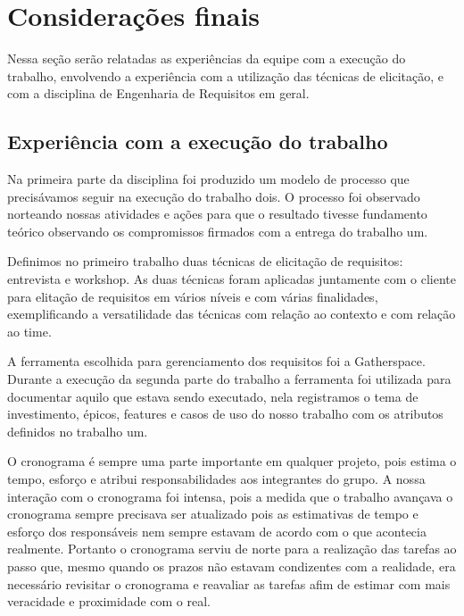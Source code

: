 \chapter[Considerações finais]{Considerações finais}
    
  Nessa seção serão relatadas as experiências da equipe com a execução do trabalho, envolvendo a experiência com 
  a utilização das técnicas de elicitação, e com a disciplina de Engenharia de Requisitos em geral.
  
  \section{Experiência com a execução do trabalho}
  
    Na primeira parte da disciplina foi produzido um modelo de processo que precisávamos seguir na execução do trabalho dois. 
  O processo foi observado norteando nossas atividades e ações para que o resultado tivesse fundamento teórico observando 
  os compromissos firmados com a entrega do trabalho um.
    
    Definimos no primeiro trabalho duas técnicas de elicitação de requisitos: entrevista e workshop. 
  As duas técnicas foram aplicadas juntamente com o cliente para elitação de requisitos em vários 
  níveis e com várias finalidades, exemplificando a versatilidade das técnicas com relação ao contexto e com relação ao time.
    
    A ferramenta escolhida para gerenciamento dos requisitos foi a Gatherspace. Durante a execução da segunda 
  parte do trabalho a ferramenta foi utilizada para documentar aquilo que estava sendo executado, nela registramos 
  o tema de investimento, épicos, features e casos de uso do nosso trabalho com os atributos definidos no trabalho um.
    
    O cronograma é sempre uma parte importante em qualquer projeto, pois estima o tempo, esforço e atribui 
  responsabilidades aos integrantes do grupo. A nossa interação com o cronograma foi intensa, 
  pois a medida que o trabalho avançava o cronograma sempre precisava ser atualizado pois as estimativas de tempo e 
  esforço dos responsáveis nem sempre estavam de acordo com o que acontecia realmente. 
  Portanto o cronograma serviu de norte para a realização das tarefas ao passo que, mesmo quando os prazos não 
  estavam condizentes com a realidade, era necessário revisitar o cronograma e reavaliar as tarefas afim de 
  estimar com mais veracidade e proximidade com o real.
    
